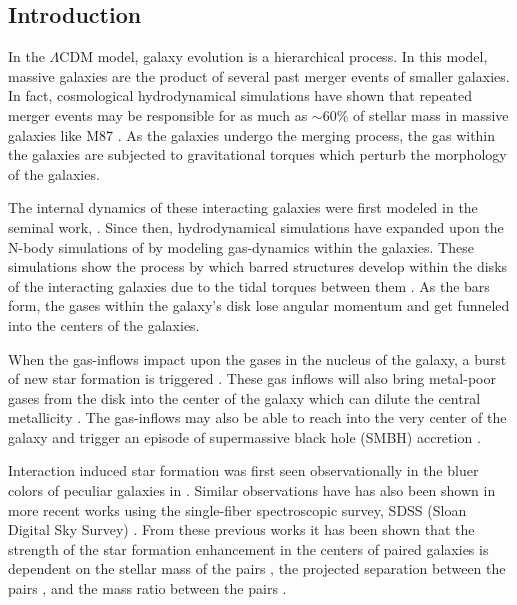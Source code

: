 \documentclass[apj,twocolumn]{emulateapj}
\begin{document}
\begin{CJK*}{UTF8}{gbsn}

\section{Introduction}\label{sec:intro}

In the $\Lambda$CDM model, galaxy evolution is a hierarchical process. In this model, massive galaxies are the product of several past merger events of smaller galaxies. In fact, cosmological hydrodynamical simulations have shown that repeated merger events may be responsible for as much as $\sim$60\% of stellar mass in massive galaxies like M87 \citep[e.g.,][]{Rodriguez-Gomez:2016,Pillepich:2018}. As the galaxies undergo the merging process, the gas within the galaxies are subjected to gravitational torques which perturb the morphology of the galaxies.

The internal dynamics of these interacting galaxies were first modeled in the seminal work, \citet{Toomre:1972}. Since then, hydrodynamical simulations have expanded upon the N-body simulations of \citet{Toomre:1972} by modeling gas-dynamics within the galaxies. These simulations show the process by which barred structures develop within the disks of the interacting galaxies due to the tidal torques between them \citep{Barnes:1991}. As the bars form, the gases within the galaxy's disk lose angular momentum and get funneled into the centers of the galaxies. 

When the gas-inflows impact upon the gases in the nucleus of the galaxy, a burst of new star formation is triggered \citep{Barnes:1996, Mihos:1996}. These gas inflows will also bring metal-poor gases from the disk into the center of the galaxy which can dilute the central metallicity \citep{Rupke:2010, Perez:2011, Scudder:2012}. The gas-inflows may also be able to reach into the very center of the galaxy and trigger an episode of supermassive black hole (SMBH) accretion \citep{Capelo:2017}. 

Interaction induced star formation was first seen observationally in the bluer colors of peculiar galaxies in \citet{Larson:1978}. Similar observations have has also been shown in more recent works using the single-fiber spectroscopic survey, SDSS (Sloan Digital Sky Survey) \citep{Ellison:2008, Li:2008, Scudder:2012, Patton:2013, Bustamante:2020}. From these previous works it has been shown that the strength of the star formation enhancement in the centers of paired galaxies is dependent on the stellar mass of the pairs \citep{Li:2008}, the projected separation between the pairs \citep{Ellison:2008, Li:2008, Scudder:2012}, and the mass ratio between the pairs \citep{Ellison:2008}. 


\end{CJK*}
\end{document}
